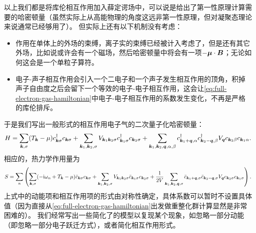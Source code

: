 以上我们都是将库伦相互作用加入薛定谔场中，可以说是给出了第一性原理计算需要的哈密顿量（虽然实际上从高能物理的角度这远非第一性原理，但对凝聚态理论来说通常已经够用了）。
但实际上还有以下机制没有考虑：
\begin{itemize}
    \item 作用在单体上的外场的束缚，离子实的束缚已经被计入考虑了，但是还有其它外场，比如说或许会有一个磁场，然后哈密顿量中将会有一项$-\vb*{\mu} \cdot \vb*{B}$；无论如何这会是一个单粒子算符。
    \item 电子-声子相互作用会引入一个二电子和一个声子发生相互作用的顶角，积掉声子自由度之后会留下一个等效的电子-电子相互作用，这会让\eqref{eq:full-electron-gas-hamiltonian}中电子-电子相互作用的系数发生变化，不再是严格的库伦排斥。
\end{itemize}
于是我们写出一般形式的相互作用电子气的二次量子化哈密顿量：
\begin{equation}
    {H} = \sum_{\vb*{k}, \sigma} (T_{\vb*{k}} - \mu) {c}^\dagger_{\vb*{k} \sigma} {c}_{\vb*{k} \sigma} 
    + \sum_{\vb*{k}_1, \vb*{k}_2, \sigma} V_{\vb*{k}_1 \vb*{k}_2 \sigma} {c}^\dagger_{\vb*{k}_1 \sigma} {c}_{\vb*{k}_2 \sigma}
    + \sum_{\vb*{k}_1, \vb*{k}_2, \vb*{q}, \alpha, \beta} {c}^\dagger_{\vb*{k}_1+\vb*{q}, \alpha} {c}^\dagger_{\vb*{k}_2-\vb*{q}, \beta} V_{\vb*{q}} {c}_{\vb*{k}_2 \beta} {c}_{\vb*{k}_1 \alpha}. 
\end{equation}
相应的，热力学作用量为
\begin{equation}
    S = \sum_n \left( 
        \sum_{\vb*{k}, \sigma} (-\mathrm{i} \omega_n + T_{\vb*{k}} - \mu) \bar{c}_{\vb*{k} \sigma} c_{\vb*{k} \sigma} 
        + \sum_{\vb*{k}_1, \vb*{k}_2, \sigma} V_{\vb*{k}_1 \vb*{k}_2 \sigma} \bar{c}_{\vb*{k}_1 \sigma} c_{\vb*{k}_2 \sigma} 
        + \frac{1}{2V} \sum_{\vb*{k}_1, \vb*{k}_2, \vb*{q}, \sigma} \bar{c}_{\vb*{k}_1+\vb*{q}, \sigma} \bar{c}_{\vb*{k}_2-\vb*{q}, \sigma} V_{\vb*{q}} c_{\vb*{k}_2 \sigma} c_{\vb*{k}_1 \sigma} \right). 
        \label{eq:general-electron-electron-interaction}
\end{equation}
上式中的动能项和相互作用项的形式由对称性确定，具体系数可以暂时不设置具体值（因为直接从\eqref{eq:full-electron-gas-hamiltonian}出发做重整化群计算显然是非常困难的）。
我们经常写出一些简化了的模型以复现某个现象，如忽略一部分动能（即忽略一部分电子跃迁方式），或者简化相互作用形式。

